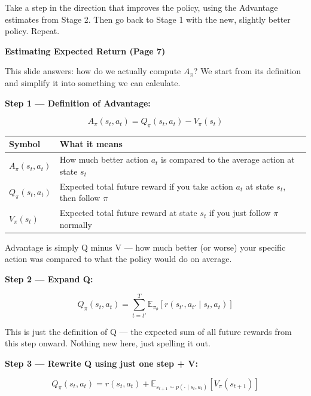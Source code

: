Take a step in the direction that improves the policy, using the Advantage estimates from Stage 2. Then go back to Stage 1 with the new, slightly better policy. Repeat.

\bigskip


\textbf{Estimating Expected Return (Page 7)}

\medskip

This slide answers: how do we actually compute $A_\pi$? We start from its definition and simplify it into something we can calculate.

\medskip

\textbf{Step 1 --- Definition of Advantage:}

\[
A_\pi(s_t, a_t) = Q_\pi(s_t, a_t) - V_\pi(s_t)
\]

\begin{center}
\begin{tabular}{ll}
\hline
Symbol & What it means \\
\hline
$A_\pi(s_t, a_t)$ & How much better action $a_t$ is compared to the average action at state $s_t$ \\
$Q_\pi(s_t, a_t)$ & Expected total future reward if you take action $a_t$ at state $s_t$, then follow $\pi$ \\
$V_\pi(s_t)$      & Expected total future reward at state $s_t$ if you just follow $\pi$ normally \\
\hline
\end{tabular}
\end{center}

Advantage is simply Q minus V --- how much better (or worse) your specific action was compared to what the policy would do on average.

\medskip

\textbf{Step 2 --- Expand Q:}

\[
Q_\pi(s_t, a_t) = \sum_{t=t'}^{T} \mathbb{E}_{\pi_\theta}[r(s_{t'}, a_{t'} \mid s_t, a_t)]
\]

This is just the definition of Q --- the expected sum of all future rewards from this step onward. Nothing new here, just spelling it out.

\medskip

\textbf{Step 3 --- Rewrite Q using just one step + V:}

\[
Q_\pi(s_t, a_t) = r(s_t, a_t) + \mathbb{E}_{s_{t+1} \sim p(\cdot \mid s_t, a_t)}[V_\pi(s_{t+1})]
\]

